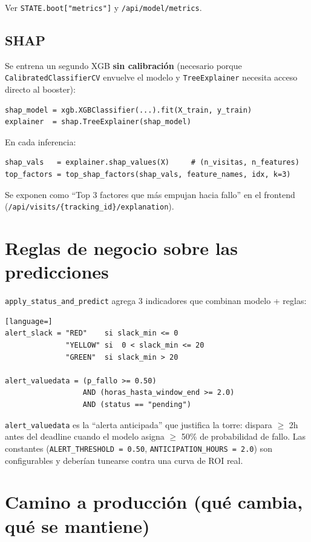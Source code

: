\documentclass[11pt,a4paper]{article}
\begin{document}
Ver \texttt{STATE.boot["metrics"]} y \texttt{/api/model/metrics}.

\subsection{SHAP}

Se entrena un segundo XGB \textbf{sin calibración} (necesario porque \texttt{CalibratedClassifierCV} envuelve el modelo y \texttt{TreeExplainer} necesita acceso directo al booster):

\begin{lstlisting}[language=pyplus]
shap_model = xgb.XGBClassifier(...).fit(X_train, y_train)
explainer  = shap.TreeExplainer(shap_model)
\end{lstlisting}

En cada inferencia:

\begin{lstlisting}[language=pyplus]
shap_vals   = explainer.shap_values(X)     # (n_visitas, n_features)
top_factors = top_shap_factors(shap_vals, feature_names, idx, k=3)
\end{lstlisting}

Se exponen como ``Top 3 factores que más empujan hacia fallo'' en el frontend (\texttt{/api/visits/\{tracking\_id\}/explanation}).

\section{Reglas de negocio sobre las predicciones}

\texttt{apply\_status\_and\_predict} agrega 3 indicadores que combinan modelo + reglas:

\begin{lstlisting}[language=]
alert_slack = "RED"    si slack_min <= 0
              "YELLOW" si  0 < slack_min <= 20
              "GREEN"  si slack_min > 20

alert_valuedata = (p_fallo >= 0.50)
                  AND (horas_hasta_window_end >= 2.0)
                  AND (status == "pending")
\end{lstlisting}

\texttt{alert\_valuedata} es la ``alerta anticipada'' que justifica la torre: dispara $\geq$ 2h antes del deadline cuando el modelo asigna $\geq$ 50\% de probabilidad de fallo. Las constantes (\texttt{ALERT\_THRESHOLD = 0.50}, \texttt{ANTICIPATION\_HOURS = 2.0}) son configurables y deberían tunearse contra una curva de ROI real.

\section{Camino a producción (qué cambia, qué se mantiene)}
\end{document}
